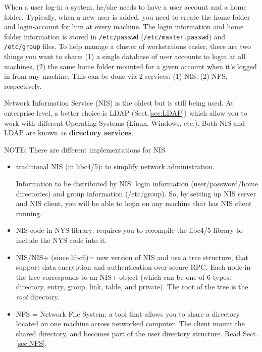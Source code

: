 When a user log-in a system, he/she needs to have a user account and a home
folder. Typically, when a new user is added, you need to create the home folder
and login-account for him at every machine. The login information and home
folder information is stored in \verb!/etc/passwd! (\verb!/etc/master.passwd!)
and \verb!/etc/group! files. To help manage a cluster of workstations
easier, there are two things you want to share: (1) a single database of user
accounts to login at all machines, (2) the same home folder mounted for a given
account when it's logged in from any machine. This can be done via 2 services:
(1) NIS, (2) NFS, respectively. 

Network Information Service (NIS) is the oldest but is still being used. At
enterprise level, a better choice is LDAP (Sect.\ref{sec:LDAP}) which allow you
to work with different Operating Systems (Linux, Windows, etc.). Both NIS and
LDAP are known as {\bf directory services}.

NOTE: There are different implementations for NIS
\begin{itemize}
  \item traditional NIS (in libc4/5): to simplify network administration.

Information to be distributed by NIS: login information (user/password/home
directories) and group information (/etc/group). So, by setting up NIS server
and NIS client, you will be able to login on any machine that has NIS client
running.

\item NIS code in NYS library: requires you to recompile the libc4/5 library to
include the NYS code into it.

\item NIS/NIS+ (since libc6)= new version of NIS and use a tree structure, that
support data encryption and authentication over secure RPC. Each
node in the tree corresponds to an NIS+ object (which can be one of 6 types:
directory, entry, group, link, table, and private). The root of the tree is the
{\it root} directory.

\item NFS = Network File System: a tool that allows you to share a directory located
on one machine across networked computer. The client mount the shared directory,
and becomes part of the user directory structure. Read Sect.\ref{sec:NFS}. 

\end{itemize}



